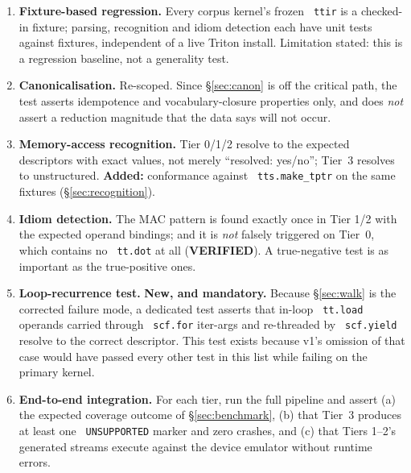 \documentclass[11pt,a4paper]{article}
\newcommand{\code}[1]{\texttt{\small\hyphenchar\font=45 #1}}
\newcommand{\verified}{\textbf{\textcolor{green!45!black}{VERIFIED}}}
\begin{document}
\begin{enumerate}[leftmargin=1.5em,itemsep=0.35em]
\item \textbf{Fixture-based regression.} Every corpus kernel's frozen \code{ttir} is a checked-in fixture;
       parsing, recognition and idiom detection each have unit tests against fixtures, independent of a live
       Triton install. Limitation stated: this is a regression baseline, not a generality test.

\item \textbf{Canonicalisation.} Re-scoped. Since \S\ref{sec:canon} is off the critical path, the test
       asserts idempotence and vocabulary-closure properties only, and does \emph{not} assert a reduction
       magnitude that the data says will not occur.

\item \textbf{Memory-access recognition.} Tier 0/1/2 resolve to the expected descriptors with exact
        values, not merely ``resolved: yes/no''; Tier~3 resolves to
       unstructured. \textbf{Added:} conformance against \code{tts.make\_tptr} on the same fixtures
       (\S\ref{sec:recognition}).

\item \textbf{Idiom detection.} The MAC pattern is found exactly once in Tier 1/2 with the expected operand
       bindings; and it is \emph{not} falsely triggered on Tier~0, which contains no \code{tt.dot} at all
       (\verified). A true-negative test is as important as the true-positive ones.

\item \textbf{Loop-recurrence test.} \textbf{New, and mandatory.} Because \S\ref{sec:walk} is the corrected
       failure mode, a dedicated test asserts that in-loop \code{tt.load} operands carried through
       \code{scf.for} iter-args and re-threaded by \code{scf.yield} resolve to the correct descriptor. This
       test exists because v1's omission of that case would have passed every other test in this list while
       failing on the primary kernel.

\item \textbf{End-to-end integration.} For each tier, run the full pipeline and assert (a) the expected
       coverage outcome of \S\ref{sec:benchmark}, (b) that Tier~3 produces at least one \code{UNSUPPORTED}
       marker and zero crashes, and (c) that Tiers 1--2's generated streams execute against the device
       emulator without runtime errors.


\end{enumerate}
\end{document}

